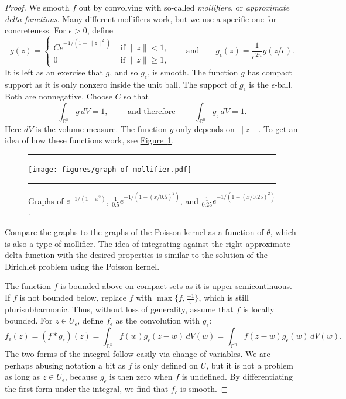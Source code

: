 \documentclass[12pt,openany]{book}
\newcommand{\snorm}[1]{\lVert {#1} \rVert}
\newcommand{\C}{{\mathbb{C}}}
\theoremstyle{plain}
\theoremstyle{remark}
\theoremstyle{definition}
\newenvironment{myfig}{%
\begin{figure}[h!t]
\noindent\rule{\textwidth}{0.5pt}\vspace{12pt}\par\centering}%
{\par\noindent\rule{\textwidth}{0.5pt}
\end{figure}}
\theoremstyle{exercise}
\theoremstyle{example}
\newcommand{\figureref}[1]{\hyperref[#1]{Figure~\ref*{#1}}}
\begin{document}
\begin{proof}
We smooth $f$ out by convolving with so-called
\emph{mollifiers}, or
\emph{approximate delta functions}.
Many different mollifiers
work, but we use a specific one for concreteness.
For $\epsilon > 0$, define
\begin{equation*}
g(z) =
\begin{cases}
C e^{-1/(1-\snorm{z}^2)} & \text{ if $\snorm{z} < 1$,}
\\
0 & \text{ if $\snorm{z} \geq 1$,}
\end{cases}
\qquad
\text{and}
\qquad
g_\epsilon(z) = \frac{1}{\epsilon^{2n}} g(z/\epsilon) .
\end{equation*}
It is left as an exercise that $g$, and so $g_\epsilon$, is smooth.
The function $g$ has compact
support as it is only nonzero inside the unit ball.  The support of
$g_\epsilon$ is the $\epsilon$-ball.  Both are nonnegative.  Choose $C$ so that
\begin{equation*}
\int_{\C^n} g\, dV = 1 ,
\qquad \text{ and therefore } \qquad
\int_{\C^n} g_\epsilon\, dV = 1 .
\end{equation*}
%
Here $dV$ is the volume measure.
The function $g$ only depends on $\snorm{z}$.
To get an idea of
how these functions work,
see \figureref{fig:graph-of-mollifier}.

\begin{myfig}
\texttt{[image: figures/graph-of-mollifier.pdf]}
\caption{Graphs of $e^{-1/(1-x^2)}$,
$\frac{1}{0.5}e^{-1/(1-{(x/0.5)}^2)}$, and
$\frac{1}{0.25}e^{-1/(1-{(x/0.25)}^2)}$.\label{fig:graph-of-mollifier}}
\end{myfig}

Compare the graphs to the graphs of the Poisson kernel as a function of
$\theta$, which is also a type of mollifier.  The idea of
integrating against the right approximate delta function with the desired properties
is similar to the solution of the Dirichlet problem using the Poisson kernel.

The function $f$ is bounded above on compact sets as it is upper semicontinuous.
If $f$ is not bounded below, replace $f$ with $\max \bigl\{ f ,
\frac{-1}{\epsilon}
\bigr\}$, which is still plurisubharmonic.  Thus, without loss of
generality,
assume that $f$ is locally bounded.
For $z \in U_\epsilon$, define $f_\epsilon$ as
the convolution with $g_\epsilon$:
%
\begin{equation*}
f_\epsilon(z) = (f * g_\epsilon)(z) =
\int_{\C^n} f(w) g_\epsilon (z-w) \, dV(w) =
\int_{\C^n} f(z-w) g_\epsilon (w) \, dV(w) .
\end{equation*}
The two forms of the integral follow easily via change of variables.
We are perhaps abusing notation a bit as $f$ is only defined on $U$,
but it is not a problem as long as $z \in
U_\epsilon$, because $g_\epsilon$ is then zero when $f$ is undefined.
By differentiating the first form under the integral, we find that
$f_\epsilon$ is smooth.


\end{proof}
\end{document}
